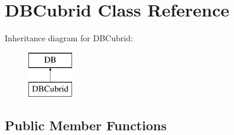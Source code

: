 \hypertarget{classDBCubrid}{}\section{D\+B\+Cubrid Class Reference}
\label{classDBCubrid}
Inheritance diagram for D\+B\+Cubrid\+:\begin{figure}[H]
\begin{center}
\leavevmode
\includegraphics[height=2.000000cm]{classDBCubrid}
\end{center}
\end{figure}
\subsection*{Public Member Functions}
